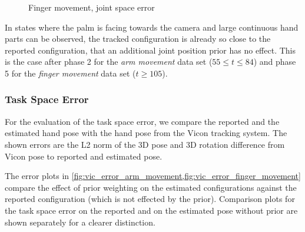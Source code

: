 \begin{figure}
\centering
{}
\caption{Finger movement, joint space error}
\label{fig:fm_joint_error}
\end{figure}

In states where the palm is facing towards the camera and large continuous hand parts can be observed, the tracked configuration is already so close to the reported configuration, that an additional joint position prior has no effect. This is the case after phase 2 for the \textit{arm movement} data set ($55\leq t \leq84$) and phase 5 for the \textit{finger movement} data set ($t \geq 105$).


\subsubsection{Task Space Error}

For the evaluation of the task space error, we compare the reported and the estimated hand pose with the hand pose from the Vicon tracking system. The shown errors are the L2 norm of the 3D pose and 3D rotation difference from Vicon pose to reported and estimated pose.

The error plots in \cref{fig:vic_error_arm_movement,fig:vic_error_finger_movement} compare the effect of prior weighting on the estimated configurations against the reported configuration (which is not effected by the prior). Comparison plots for the task space error on the reported and on the estimated pose without prior are shown separately for a clearer distinction.

